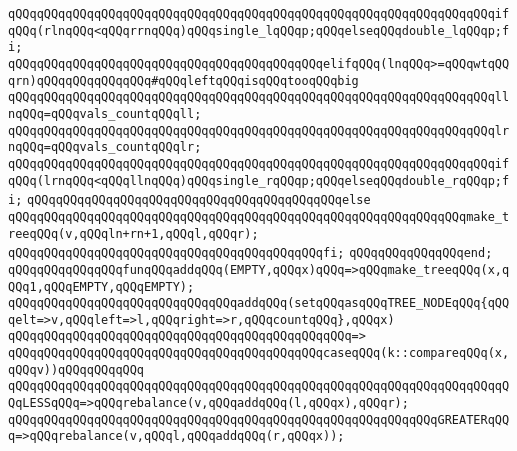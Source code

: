 \newline
\verb|qQQqqQQqqQQqqQQqqQQqqQQqqQQqqQQqqQQqqQQqqQQqqQQqqQQqqQQqqQQqqQQqqQQqifqQQq(rlnqQQq<qQQqrrnqQQq)qQQqsingle_lqQQqp;qQQqelseqQQqdouble_lqQQqp;fi;|\newline
\newline
\verb|qQQqqQQqqQQqqQQqqQQqqQQqqQQqqQQqqQQqqQQqqQQqelifqQQq(lnqQQq>=qQQqwtqQQqrn)qQQqqQQqqQQqqQQq#qQQqleftqQQqisqQQqtooqQQqbig|\newline
\newline
\verb|qQQqqQQqqQQqqQQqqQQqqQQqqQQqqQQqqQQqqQQqqQQqqQQqqQQqqQQqqQQqqQQqqQQqllnqQQq=qQQqvals_countqQQqll;|\newline
\verb|qQQqqQQqqQQqqQQqqQQqqQQqqQQqqQQqqQQqqQQqqQQqqQQqqQQqqQQqqQQqqQQqqQQqlrnqQQq=qQQqvals_countqQQqlr;|\newline
\newline
\verb|qQQqqQQqqQQqqQQqqQQqqQQqqQQqqQQqqQQqqQQqqQQqqQQqqQQqqQQqqQQqqQQqqQQqifqQQq(lrnqQQq<qQQqllnqQQq)qQQqsingle_rqQQqp;qQQqelseqQQqdouble_rqQQqp;fi;|\newline
\newline
\verb|qQQqqQQqqQQqqQQqqQQqqQQqqQQqqQQqqQQqqQQqqQQqelse|\newline
\verb|qQQqqQQqqQQqqQQqqQQqqQQqqQQqqQQqqQQqqQQqqQQqqQQqqQQqqQQqqQQqqQQqmake_treeqQQq(v,qQQqln+rn+1,qQQql,qQQqr);|\newline
\verb|qQQqqQQqqQQqqQQqqQQqqQQqqQQqqQQqqQQqqQQqqQQqfi;|\newline
\verb|qQQqqQQqqQQqqQQqend;|\newline
\newline
\verb|qQQqqQQqqQQqqQQqfunqQQqaddqQQq(EMPTY,qQQqx)qQQq=>qQQqmake_treeqQQq(x,qQQq1,qQQqEMPTY,qQQqEMPTY);|\newline
\newline
\verb|qQQqqQQqqQQqqQQqqQQqqQQqqQQqqQQqaddqQQq(setqQQqasqQQqTREE_NODEqQQq{qQQqelt=>v,qQQqleft=>l,qQQqright=>r,qQQqcountqQQq},qQQqx)|\newline
\verb|qQQqqQQqqQQqqQQqqQQqqQQqqQQqqQQqqQQqqQQqqQQqqQQq=>|\newline
\verb|qQQqqQQqqQQqqQQqqQQqqQQqqQQqqQQqqQQqqQQqqQQqcaseqQQq(k::compareqQQq(x,qQQqv))qQQqqQQqqQQq|\newline
\verb|qQQqqQQqqQQqqQQqqQQqqQQqqQQqqQQqqQQqqQQqqQQqqQQqqQQqqQQqqQQqqQQqqQQqqQQqLESSqQQq=>qQQqrebalance(v,qQQqaddqQQq(l,qQQqx),qQQqr);|\newline
\verb|qQQqqQQqqQQqqQQqqQQqqQQqqQQqqQQqqQQqqQQqqQQqqQQqqQQqqQQqqQQqGREATERqQQq=>qQQqrebalance(v,qQQql,qQQqaddqQQq(r,qQQqx));|\newline
